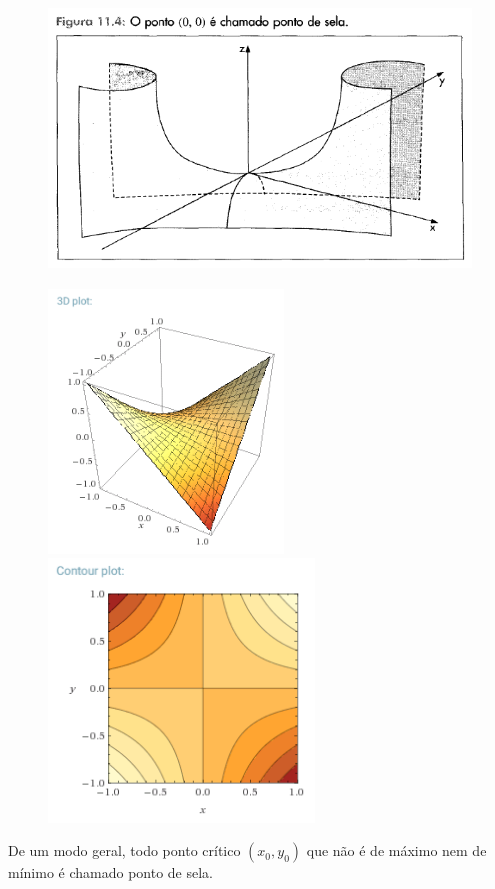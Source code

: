 \begin{enumerate}[label=(\roman*)]
			\begin{figure}[H]
				\includegraphics[height=7cm]{images/morettin_figura-11-4}
			\end{figure}

			\begin{figure}[H]
				\includegraphics[height=7cm]{images/wolframalpha_figura-1-1}
				\includegraphics[height=7cm]{images/wolframalpha_figura-1-2} \cite{wolframalpha}
			\end{figure}

			De um modo geral, todo ponto crítico $(x_{0}, y_{0})$ que não é de máximo nem de mínimo é chamado ponto de sela.


\end{enumerate}
